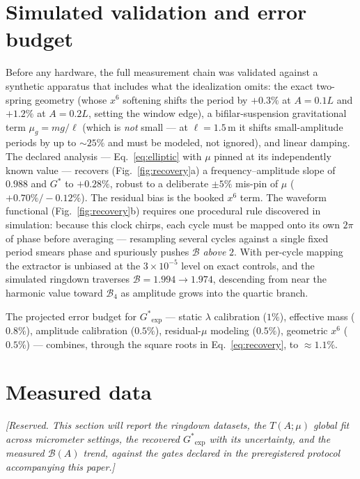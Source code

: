 \documentclass[11pt,a4paper]{article}
\newcommand{\Gstar}{{G^{*}}}
\begin{document}
\section{Simulated validation and error budget}
\label{sec:validation}

Before any hardware, the full measurement chain was validated against a
synthetic apparatus that includes what the idealization omits: the exact
two-spring geometry (whose $x^{6}$ softening shifts the period by $+0.3\%$ at
$A=0.1L$ and $+1.2\%$ at $A=0.2L$, setting the window edge), a
bifilar-suspension gravitational term $\mu_g = mg/\ell$ (which is \emph{not}
small --- at $\ell=1.5$\,m it shifts small-amplitude periods by up to
$\sim25\%$ and must be modeled, not ignored), and linear damping. The
declared analysis --- Eq.~\eqref{eq:elliptic} with $\mu$ pinned at its
independently known value --- recovers (Fig.~\ref{fig:recovery}a) a
frequency--amplitude slope of $0.988$ and $\Gstar$ to $+0.28\%$, robust to a
deliberate $\pm5\%$ mis-pin of $\mu$ ($+0.70\%/-0.12\%$). The residual bias
is the booked $x^{6}$ term. The waveform functional
(Fig.~\ref{fig:recovery}b) requires one procedural rule discovered in
simulation: because this clock chirps, each cycle must be mapped onto its own
$2\pi$ of phase before averaging --- resampling several cycles against a
single fixed period smears phase and spuriously pushes $\mathcal B$
\emph{above} $2$. With per-cycle mapping the extractor is unbiased at the
$3\times10^{-5}$ level on exact controls, and the simulated ringdown
traverses $\mathcal B = 1.994\to1.974$, descending from near the harmonic
value toward $\mathcal B_4$ as amplitude grows into the quartic branch.

The projected error budget for $\Gstar_{\mathrm{exp}}$ --- static $\lambda$
calibration ($1\%$), effective mass ($0.8\%$), amplitude calibration
($0.5\%$), residual-$\mu$ modeling ($0.5\%$), geometric $x^{6}$ ($0.5\%$) ---
combines, through the square roots in Eq.~\eqref{eq:recovery}, to
$\approx1.1\%$.

\section{Measured data}
\label{sec:data}

\emph{[Reserved. This section will report the ringdown datasets, the
$T(A;\mu)$ global fit across micrometer settings, the recovered
$\Gstar_{\mathrm{exp}}$ with its uncertainty, and the measured
$\mathcal B(A)$ trend, against the gates declared in the preregistered
protocol accompanying this paper.]}
\end{document}
